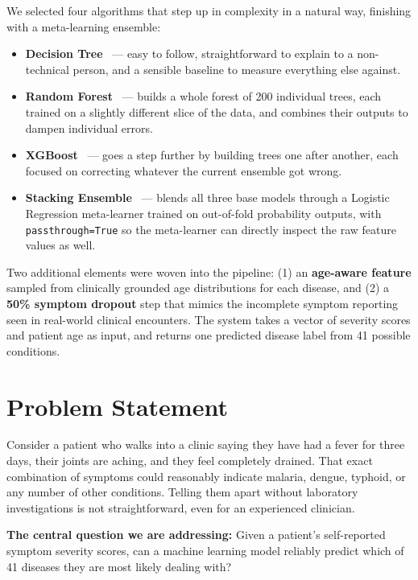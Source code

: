\documentclass[12pt,a4paper]{article}
\begin{document}
We selected four algorithms that step up in complexity in a natural way, finishing with a meta-learning ensemble:

\begin{itemize}
    \item \textbf{Decision Tree}~\cite{quinlan1986} --- easy to follow, straightforward to explain to a non-technical person, and a sensible baseline to measure everything else against.
    \item \textbf{Random Forest}~\cite{breiman2001} --- builds a whole forest of 200 individual trees, each trained on a slightly different slice of the data, and combines their outputs to dampen individual errors.
    \item \textbf{XGBoost}~\cite{chen2016xgboost} --- goes a step further by building trees one after another, each focused on correcting whatever the current ensemble got wrong.
    \item \textbf{Stacking Ensemble}~\cite{wolpert1992} --- blends all three base models through a Logistic Regression meta-learner trained on out-of-fold probability outputs, with \texttt{passthrough=True} so the meta-learner can directly inspect the raw feature values as well.
\end{itemize}

Two additional elements were woven into the pipeline: (1) an \textbf{age-aware feature} sampled from clinically grounded age distributions for each disease, and (2) a \textbf{50\% symptom dropout} step that mimics the incomplete symptom reporting seen in real-world clinical encounters. The system takes a vector of severity scores and patient age as input, and returns one predicted disease label from 41 possible conditions.

\section{Problem Statement}

Consider a patient who walks into a clinic saying they have had a fever for three days, their joints are aching, and they feel completely drained. That exact combination of symptoms could reasonably indicate malaria, dengue, typhoid, or any number of other conditions. Telling them apart without laboratory investigations is not straightforward, even for an experienced clinician.

\textbf{The central question we are addressing:} Given a patient's self-reported symptom severity scores, can a machine learning model reliably predict which of 41 diseases they are most likely dealing with?
\end{document}
